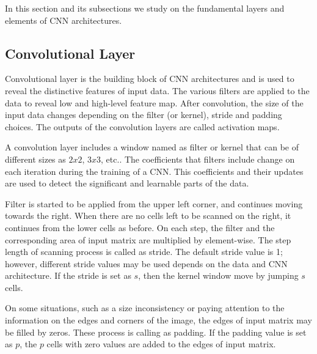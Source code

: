In this section and its subsections we study on the fundamental layers and elements of CNN architectures. 

\subsection{Convolutional Layer}

Convolutional layer is the building block of CNN architectures and is used to reveal the distinctive features of input data. The various filters are applied to the data to reveal low and high-level feature map. After convolution, the size of the input data changes depending on the filter (or kernel), stride and padding choices. The outputs of the convolution layers are called activation maps.

A convolution layer includes a window named as filter or kernel that can be of different sizes as $2x2$, $3x3$, etc.. The coefficients that filters include change on each iteration during the training of a CNN. This coefficients and their updates are used to detect the significant and learnable parts of the data.

Filter is started to be applied from the upper left corner, and continues moving towards the right. When there are no cells left to be scanned on the right, it continues from the lower cells as before. On each step, the filter and the corresponding area of input matrix are multiplied by element-wise. The step length of scanning process is called as stride. The default stride value is 1; however, different stride values may be used depends on the data and CNN architecture. If the stride is set as $s$, then the kernel window move by jumping $s$ cells.

On some situations, such as a size inconsistency or paying attention to the information on the edges and corners of the image, the edges of input matrix may be filled by zeros. These process is calling as padding. If the padding value is set as $p$, the $p$ cells with zero values are added to the edges of input matrix.

